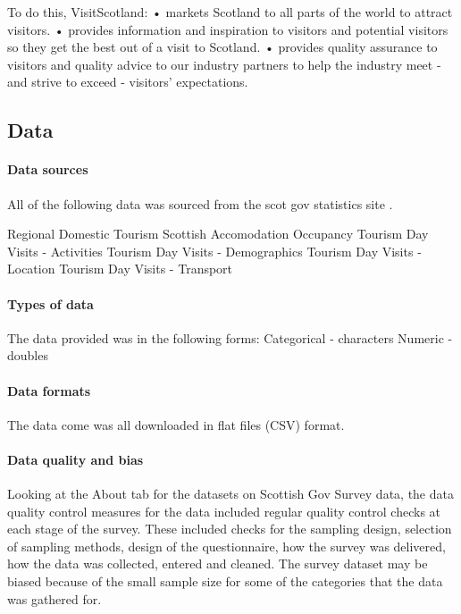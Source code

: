 \documentclass[
]{article}
\begin{document}
To do this, VisitScotland: • markets Scotland to all parts of the world
to attract visitors. • provides information and inspiration to visitors
and potential visitors so they get the best out of a visit to Scotland.
• provides quality assurance to visitors and quality advice to our
industry partners to help the industry meet - and strive to exceed -
visitors' expectations.

\hypertarget{data}{%
\subsection{Data}\label{data}}

\hypertarget{data-sources}{%
\paragraph{Data sources}\label{data-sources}}

All of the following data was sourced from the scot gov statistics site
.

Regional Domestic Tourism Scottish Accomodation Occupancy Tourism Day
Visits - Activities Tourism Day Visits - Demographics Tourism Day Visits
- Location Tourism Day Visits - Transport

\hypertarget{types-of-data}{%
\paragraph{Types of data}\label{types-of-data}}

The data provided was in the following forms: Categorical - characters
Numeric - doubles

\hypertarget{data-formats}{%
\paragraph{Data formats}\label{data-formats}}

The data come was all downloaded in flat files (CSV) format.

\hypertarget{data-quality-and-bias}{%
\paragraph{Data quality and bias}\label{data-quality-and-bias}}

Looking at the About tab for the datasets on Scottish Gov Survey data,
the data quality control measures for the data included regular quality
control checks at each stage of the survey. These included checks for
the sampling design, selection of sampling methods, design of the
questionnaire, how the survey was delivered, how the data was collected,
entered and cleaned. The survey dataset may be biased because of the
small sample size for some of the categories that the data was gathered
for.
\end{document}
